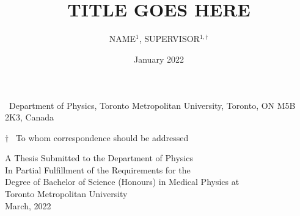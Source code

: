 \title{\\[3em] TITLE GOES HERE}
\author{NAME$^{1}$, SUPERVISOR$^{1, \dagger}$}
\date{January 2022}

\maketitle
\thispagestyle{noNumber}

{\small
\begin{affiliations}
 \item \, Department of Physics, Toronto Metropolitan University, Toronto, ON M5B 2K3, Canada
 \item[$\dagger$] \, To whom correspondence should be addressed
\end{affiliations}
}


\vspace{3em}
\begin{flushright}
\small
A Thesis Submitted to the Department of Physics \\
In Partial Fulfillment of the Requirements for the \\
Degree of Bachelor of Science (Honours) in Medical Physics at \\
Toronto Metropolitan University \\
March, 2022
\end{flushright}